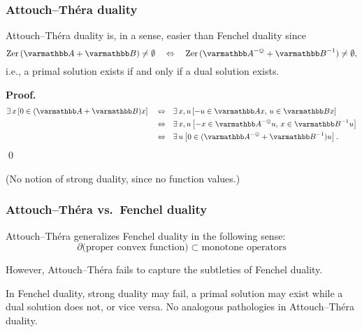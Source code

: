 \documentclass[10pt,mathserif]{beamer}
\begin{document}
\begin{frame}
\frametitle{Attouch--Th\'era duality}
Attouch--Th\'era duality is, in a sense, easier than Fenchel duality since
\[
\zer(\opA+\opB)\ne\emptyset
\quad\Leftrightarrow\quad
\zer(\opA^{-\ovee}+\opB^{-1})\ne\emptyset,
\]
i.e., a primal solution exists if and only if a dual solution exists.
\vspace{0.2in}

\textbf{Proof.}
\begin{align*}
\exists\,x
\left[0\in (\opA +\opB )x\right]
\quad\Leftrightarrow\quad&
\exists\,x,u 
\left[-u \in \opA x,\,u  \in \opB x\right]\\
\quad\Leftrightarrow\quad&
\exists\,x,u 
\left[-x\in \opA ^{-\ovee}u ,\,x \in \opB ^{-1}u \right]\\
\quad\Leftrightarrow\quad&
\exists\,u 
\left[0\in (\opA ^{-\ovee}+\opB ^{-1})u \right].
\end{align*}
\qed

(No notion of strong duality, since no function values.)
\end{frame}

\begin{frame}
\frametitle{Attouch--Th\'era vs.\ Fenchel duality}

Attouch--Th\'era generalizes Fenchel duality in the following sense:
\[
\partial\text{(proper convex function)}\subset \text{monotone operators}
\]

\vspace{0.2in}
However, Attouch--Th\'era fails to capture the subtleties of Fenchel duality.

\vspace{0.2in}


In Fenchel duality, strong duality may fail, a primal solution may exist while a dual solution does not, or vice versa.
No analogous pathologies in Attouch--Th\'era duality.
\end{frame}
\end{document}
